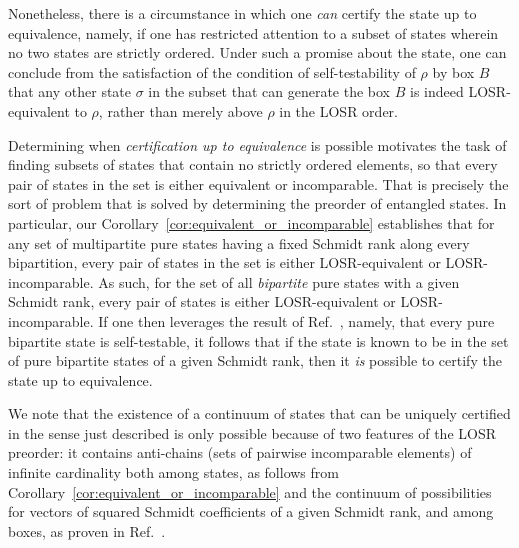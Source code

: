 \documentclass[12pt]{article}
\theoremstyle{plain}
\theoremstyle{definition}
\begin{document}
\begin{appendices}
Nonetheless, there is a circumstance in which one {\em can} certify the state up to equivalence, namely, if one has restricted  attention to a subset of states wherein no two states are strictly ordered.   Under such a promise about the state, one can conclude from the satisfaction of the condition of self-testability of $\rho$ by box $B$ that any other state $\sigma$ in the subset that can generate the box $B$ is indeed LOSR-equivalent to $\rho$, rather than merely above $\rho$ in the LOSR order.

Determining when {\em certification up to equivalence} is possible motivates the task of finding  subsets of states that contain no strictly ordered elements, so that every pair of states in the set is either equivalent or incomparable. 
 That is precisely the sort of problem that is solved by determining the preorder of entangled states.  
In particular, our Corollary~\ref{cor:equivalent_or_incomparable} establishes that for any set of multipartite pure states having a fixed Schmidt rank along every bipartition, every pair of states in the set is either LOSR-equivalent or LOSR-incomparable.  As such, for the set of all {\em bipartite} pure states with a given Schmidt rank, every pair of states is either LOSR-equivalent or LOSR-incomparable.  If one then leverages the result of Ref.~\cite{Coladangelo2017}, namely, that every pure bipartite state is self-testable, it follows that if the state is known to be in the set of  pure bipartite states of a given Schmidt rank, then it {\em is} possible to certify the state up to equivalence.

We note that the existence of a continuum of states that can be uniquely certified in the sense just described is only possible because of two features of the LOSR preorder: it contains anti-chains (sets of pairwise incomparable elements) of infinite cardinality both among states, as follows from Corollary~\ref{cor:equivalent_or_incomparable} and the continuum of possibilities for vectors of squared Schmidt coefficients of a given Schmidt rank, and among boxes, as proven in Ref.~\cite{wolfe2020quantifying}.   


\end{appendices}
\end{document}

